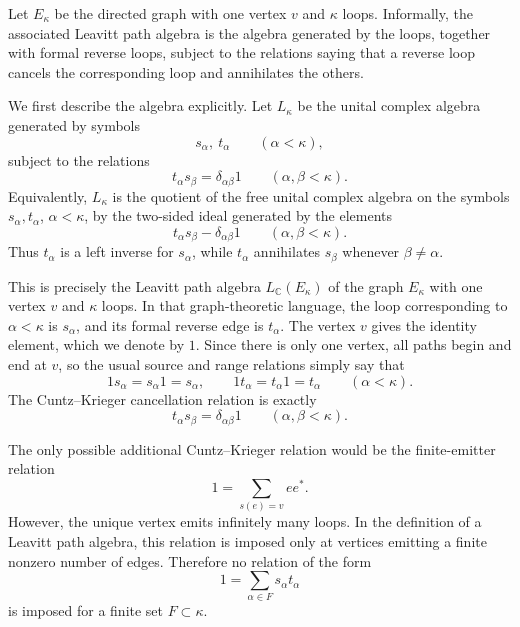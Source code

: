 \documentclass[11pt,reqno]{amsart}
\makeatletter
\theoremstyle{plain}
\theoremstyle{definition}
\newcommand{\C}{\mathbb C}
\newcounter{problempaper}
\newenvironment{problempaperbody}{%
  \setcounter{subsection}{0}%
  \setcounter{subsubsection}{0}%
  \setcounter{paragraph}{0}%
  \renewcommand{\thesubsection}{\arabic{subsection}}%
  \renewcommand{\thesubsubsection}{\thesubsection.\arabic{subsubsection}}%
  \renewcommand{\theparagraph}{\thesubsubsection.\arabic{paragraph}}%
  \let\problem@outersection\section
  \let\problem@outersubsection\subsection
  \let\problem@outersubsubsection\subsubsection
  \let\problem@outerparagraph\paragraph
  \let\section\problem@papersection
  \let\subsection\problem@papersubsection
  \let\subsubsection\problem@papersubsubsection
}{%
  \let\section\problem@outersection
  \let\subsection\problem@outersubsection
  \let\subsubsection\problem@outersubsubsection
  \let\paragraph\problem@outerparagraph
}
\newcommand{\problem@target}[2]{%
  \hypertarget{problem-\theproblempaper-#1-#2}{}%
}
\newcommand{\problem@paperheading}[3]{%
  \par\bigskip
  \problem@target{#1}{#2}%
  \noindent{\large\bfseries #2.\quad #3\par}%
  \nobreak\smallskip
}
\newcommand{\problem@papersubheading}[3]{%
  \par\medskip
  \problem@target{#1}{#2}%
  \noindent{\normalsize\bfseries #2.\quad #3\par}%
  \nobreak\smallskip
}
\newcommand{\problem@papersubsubheading}[3]{%
  \par\smallskip
  \problem@target{#1}{#2}%
  \noindent{\normalsize\itshape #2.\quad #3.\ }%
}
\def\problem@papersection{%
  \@ifstar{\problem@papersectionstar}{\problem@papersectionnostar}%
}
\def\problem@papersectionstar#1{%
  \par\bigskip\noindent{\large\bfseries #1\par}\nobreak\smallskip
}
\def\problem@papersectionnostar#1{%
  \refstepcounter{subsection}%
  \setcounter{subsubsection}{0}%
  \setcounter{paragraph}{0}%
  \problem@paperheading{section}{\thesubsection}{#1}%
  \problem@writecontentsline{section}{\thesubsection}{#1}%
}
\def\problem@papersubsection{%
  \@ifstar{\problem@papersubsectionstar}{\problem@papersubsectionnostar}%
}
\def\problem@papersubsectionstar#1{%
  \par\medskip\noindent{\normalsize\bfseries #1\par}\nobreak\smallskip
}
\def\problem@papersubsectionnostar#1{%
  \refstepcounter{subsubsection}%
  \setcounter{paragraph}{0}%
  \problem@papersubheading{subsection}{\thesubsubsection}{#1}%
  \problem@writecontentsline{subsection}{\thesubsubsection}{#1}%
}
\def\problem@papersubsubsection{%
  \@ifstar{\problem@papersubsubsectionstar}{\problem@papersubsubsectionnostar}%
}
\def\problem@papersubsubsectionstar#1{%
  \par\smallskip\noindent{\normalsize\itshape #1.\ }%
}
\def\problem@papersubsubsectionnostar#1{%
  \refstepcounter{paragraph}%
  \problem@papersubsubheading{subsubsection}{\theparagraph}{#1}%
  \problem@writecontentsline{subsubsection}{\theparagraph}{#1}%
}
\newcommand{\problem@writecontentsline}[3]{%
  \begingroup
  \protected@write\@auxout{}{%
    \string\problemcontentsentry{\theproblempaper}{#1}{#2}{#3}{\thepage}%
  }%
  \endgroup
}
\newcommand{\problemcontentsentry}[5]{%
  \@ifundefined{problemcontents@#1}{%
    \expandafter\gdef\csname problemcontents@#1\endcsname{}%
  }{}%
  \expandafter\g@addto@macro\csname problemcontents@#1\endcsname{%
    \problemcontentsline{#1}{#2}{#3}{#4}{#5}%
  }%
}
\newcommand{\problemcontentslink}[4]{%
  \hyperlink{problem-#1-#2-#3}{#4}%
}
\newcommand{\problemcontentsline}[5]{%
  \ifstrequal{#2}{section}{%
    \par\noindent
    \problemcontentslink{#1}{#2}{#3}{\makebox[2.5em][l]{#3}#4}%
    \nobreak\dotfill
    \problemcontentslink{#1}{#2}{#3}{#5}\par
  }{%
    \ifstrequal{#2}{subsection}{%
      \par\noindent\hspace*{1.5em}%
      \problemcontentslink{#1}{#2}{#3}{\makebox[3.5em][l]{#3}#4}%
      \nobreak\dotfill
      \problemcontentslink{#1}{#2}{#3}{#5}\par
    }{%
      \par\noindent\hspace*{3em}%
      \problemcontentslink{#1}{#2}{#3}{\makebox[4.5em][l]{#3}#4}%
      \nobreak\dotfill
      \problemcontentslink{#1}{#2}{#3}{#5}\par
    }%
  }%
}
\makeatother
\begin{document}
\begin{problempaperbody}
Let $E_\kappa$ be the directed graph with one vertex $v$ and $\kappa$ loops. Informally, the associated Leavitt path algebra is the algebra generated by the loops, together with formal reverse loops, subject to the relations saying that a reverse loop cancels the corresponding loop and annihilates the others.

We first describe the algebra explicitly. Let $L_\kappa$ be the unital complex algebra generated by symbols
\begin{equation*}
        s_\alpha,\ t_\alpha \qquad(\alpha<\kappa),
\end{equation*}
subject to the relations
\begin{equation}\label{eq:levit-relations}
        t_\alpha s_\beta=\delta_{\alpha\beta}1 \qquad(\alpha,\beta<\kappa).
\end{equation}
Equivalently, $L_\kappa$ is the quotient of the free unital complex algebra on the symbols $s_\alpha,t_\alpha$, $\alpha<\kappa$, by the two-sided ideal generated by the elements
\begin{equation*}
        t_\alpha s_\beta-\delta_{\alpha\beta}1 \qquad(\alpha,\beta<\kappa).
\end{equation*}
Thus $t_\alpha$ is a left inverse for $s_\alpha$, while $t_\alpha$ annihilates $s_\beta$ whenever $\beta\ne\alpha$.

This is precisely the Leavitt path algebra $L_{\C}(E_\kappa)$ of the graph $E_\kappa$ with one vertex $v$ and $\kappa$ loops. In that graph-theoretic language, the loop corresponding to $\alpha<\kappa$ is $s_\alpha$, and its formal reverse edge is $t_\alpha$. The vertex $v$ gives the identity element, which we denote by $1$. Since there is only one vertex, all paths begin and end at $v$, so the usual source and range relations simply say that
\begin{equation*}
        1s_\alpha=s_\alpha1=s_\alpha, \qquad 1t_\alpha=t_\alpha1=t_\alpha \qquad(\alpha<\kappa).
\end{equation*}
The Cuntz--Krieger cancellation relation is exactly
\begin{equation*}
        t_\alpha s_\beta=\delta_{\alpha\beta}1 \qquad(\alpha,\beta<\kappa).
\end{equation*}

The only possible additional Cuntz--Krieger relation would be the finite-emitter relation
\begin{equation*}
        1=\sum_{s(e)=v}ee^*.
\end{equation*}
However, the unique vertex emits infinitely many loops. In the definition of a Leavitt path algebra, this relation is imposed only at vertices emitting a finite nonzero number of edges. Therefore no relation of the form
\begin{equation*}
        1=\sum_{\alpha\in F}s_\alpha t_\alpha
\end{equation*}
is imposed for a finite set $F\subset\kappa$.


\end{problempaperbody}
\end{document}
